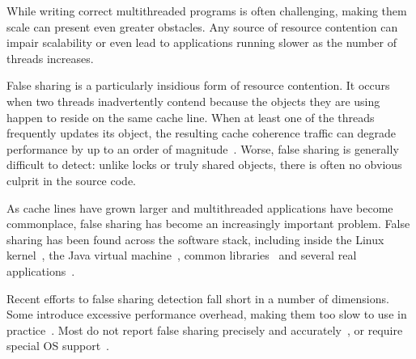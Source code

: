 
\label{sec:intro} 

While writing correct multithreaded programs is often challenging,
making them scale can present even greater obstacles. Any source of
resource contention can impair scalability or even lead to
applications running slower as the number of threads increases.

False sharing is a particularly insidious form of resource contention.
It occurs when two threads inadvertently contend because the objects
they are using happen to reside on the same cache line. When at least
one of the threads frequently updates its object, the resulting cache
coherence traffic can degrade performance by up to an order of
magnitude~\cite{falseshareeffect}. Worse, false sharing is generally
difficult to detect: unlike locks or truly shared objects, there is
often no obvious culprit in the source code.

As cache lines have grown larger and multithreaded applications have
become commonplace, false sharing has become an increasingly important
problem. False sharing has been found across the software stack,
including inside the Linux kernel~\cite{OSfalsesharing}, the Java
virtual machine~\cite{JVMfalsesharing}, common
libraries~\cite{libfalsesharing} and several real
applications~\cite{appfalsesharing, mysql}.

Recent efforts to false sharing detection fall short in a number of
dimensions. Some introduce excessive performance overhead, making them
too slow to use in practice~\cite{falseshare:simulator,
falseshare:binaryinstrumentation1,falseshare:binaryinstrumentation2}. Most
do not report false sharing precisely and
accurately~\cite{qinzhaodetection, detect:ptu, detect:intel,
falseshare:binaryinstrumentation1, DProf,
falseshare:binaryinstrumentation2}, or require special OS
support~\cite{OSdetection}.

